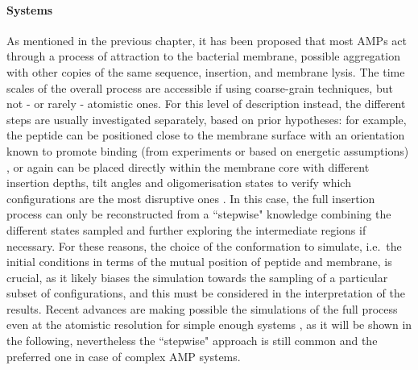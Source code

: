 \paragraph{Systems} As mentioned in the previous chapter, it has been proposed that most AMPs act through a process of attraction to the bacterial membrane, possible aggregation with other copies of the same sequence, insertion, and membrane lysis. The time scales of the overall process are accessible if using coarse-grain techniques, but not - or rarely - atomistic ones.
%
For this level of description instead, the different steps are usually investigated separately, based on prior hypotheses: for example, the peptide can be positioned close to the membrane surface with an orientation known to promote binding (from experiments or based on energetic assumptions) \cite{Wang2012}, or again can be placed directly within the membrane core with different insertion depths, tilt angles and oligomerisation states to verify which configurations are the most disruptive ones \cite{Lipkin2017}. In this case, the full insertion process can only be reconstructed from a ``stepwise" knowledge combining the different states sampled and further exploring the intermediate regions if necessary.
%
For these reasons, the choice of the conformation to simulate, i.e.\ the initial conditions in terms of the mutual position of peptide and membrane, is crucial, as it likely biases the simulation towards the sampling of a particular subset of configurations, and this must be considered in the interpretation of the results. Recent advances are making possible the simulations of the full process even at the atomistic resolution for simple enough systems \cite{Ulmschneider2017,Sun2015}, as it will be shown in the following, nevertheless the ``stepwise" approach is still common and the preferred one in case of complex AMP systems.

